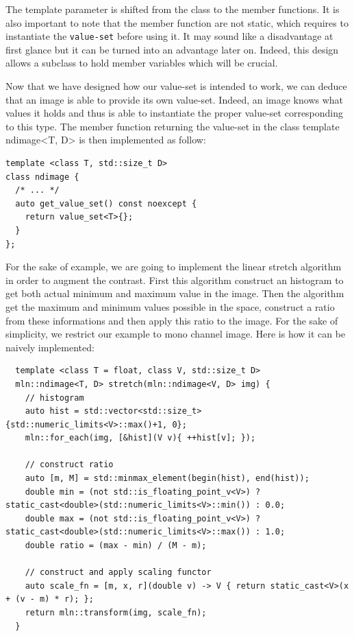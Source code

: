 The template parameter is shifted from the class to the member functions. It is also important to note that the member
function are not static, which requires to instantiate the \texttt{value-set} before using it. It may sound like a
disadvantage at first glance but it can be turned into an advantage later on. Indeed, this design allows a subclass to
hold member variables which will be crucial.

Now that we have designed how our value-set is intended to work, we can deduce that an image is able to provide its own
value-set. Indeed, an image knows what values it holds and thus is able to instantiate the proper value-set
corresponding to this type. The member function returning the value-set in the class template ndimage<T, D> is then
implemented as follow:

\begin{verbatim}
template <class T, std::size_t D>
class ndimage {
  /* ... */
  auto get_value_set() const noexcept {
    return value_set<T>{};
  }
};
\end{verbatim}

For the sake of example, we are going to implement the linear stretch algorithm in order to augment the contrast. First
this algorithm construct an histogram to get both actual minimum and maximum value in the image. Then the algorithm get
the maximum and minimum values possible in the space, construct a ratio from these informations and then apply this
ratio to the image. For the sake of simplicity, we restrict our example to mono channel image. Here is how it can be
naively implemented:

\begin{verbatim}
  template <class T = float, class V, std::size_t D>
  mln::ndimage<T, D> stretch(mln::ndimage<V, D> img) {
    // histogram
    auto hist = std::vector<std::size_t>{std::numeric_limits<V>::max()+1, 0};
    mln::for_each(img, [&hist](V v){ ++hist[v]; });
    
    // construct ratio
    auto [m, M] = std::minmax_element(begin(hist), end(hist));
    double min = (not std::is_floating_point_v<V>) ? static_cast<double>(std::numeric_limits<V>::min()) : 0.0;
    double max = (not std::is_floating_point_v<V>) ? static_cast<double>(std::numeric_limits<V>::max()) : 1.0;
    double ratio = (max - min) / (M - m);
  
    // construct and apply scaling functor
    auto scale_fn = [m, x, r](double v) -> V { return static_cast<V>(x + (v - m) * r); };
    return mln::transform(img, scale_fn);
  }
\end{verbatim}

